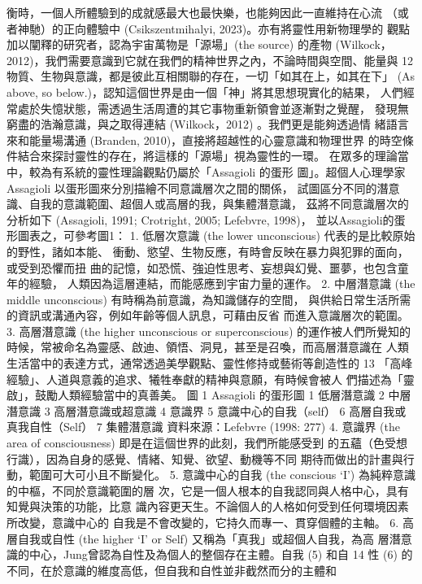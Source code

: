 衡時，一個人所體驗到的成就感最大也最快樂，也能夠因此一直維持在心流
（或者神馳）的正向體驗中 (Csikszentmihalyi, 2023)。亦有將靈性用新物理學的
觀點加以闡釋的研究者，認為宇宙萬物是「源場」(the source) 的產物 (Wilkock，
2012)，我們需要意識到它就在我們的精神世界之內，不論時間與空間、能量與
12 
物質、生物與意識，都是彼此互相關聯的存在，一切「如其在上，如其在下」
(As above, so below.)，認知這個世界是由一個「神」將其思想現實化的結果，
人們經常處於失憶狀態，需透過生活周遭的其它事物重新領會並逐漸對之覺醒，
發現無窮盡的浩瀚意識，與之取得連結 (Wilkock，2012) 。我們更是能夠透過情
緒語言來和能量場溝通 (Branden, 2010)，直接將超越性的心靈意識和物理世界
的時空條件結合來探討靈性的存在，將這樣的「源場」視為靈性的一環。 
在眾多的理論當中，較為有系統的靈性理論觀點仍屬於「Assagioli 的蛋形
圖」。超個人心理學家 Assagioli 以蛋形圖來分別描繪不同意識層次之間的關係，
試圖區分不同的潛意識、自我的意識範圍、超個人或高層的我，與集體潛意識，
茲將不同意識層次的分析如下 (Assagioli, 1991; Crotright, 2005; Lefebvre, 1998)，
並以Assagioli的蛋形圖表之，可參考圖1： 
1. 低層次意識 (the lower unconscious) 代表的是比較原始的野性，諸如本能、
衝動、慾望、生物反應，有時會反映在暴力與犯罪的面向，或受到恐懼而扭
曲的記憶，如恐慌、強迫性思考、妄想與幻覺、噩夢，也包含童年的經驗，
人類因為這層連結，而能感應到宇宙力量的運作。 
2. 中層潛意識 (the middle unconscious) 有時稱為前意識，為知識儲存的空間，
與供給日常生活所需的資訊或溝通內容，例如年齡等個人訊息，可藉由反省
而進入意識層次的範圍。 
3. 高層潛意識 (the higher unconscious or superconscious) 的運作被人們所覺知的
時候，常被命名為靈感、啟迪、領悟、洞見，甚至是召喚，而高層潛意識在
人類生活當中的表達方式，通常透過美學觀點、靈性修持或藝術等創造性的
13 
「高峰經驗」、人道與意義的追求、犧牲奉獻的精神與意願，有時候會被人
們描述為「靈啟」，鼓勵人類經驗當中的真善美。 
圖 1  
Assagioli 的蛋形圖 
1  低層潛意識 
2 中層潛意識 
3 高層潛意識或超意識 
4 意識界 
5 意識中心的自我（self） 
6 高層自我或真我自性（Self） 
7 集體潛意識 
資料來源：Lefebvre (1998: 277) 
4. 意識界 (the area of consciousness) 即是在這個世界的此刻，我們所能感受到
的五蘊（色受想行識），因為自身的感覺、情緒、知覺、欲望、動機等不同
期待而做出的計畫與行動，範圍可大可小且不斷變化。 
5. 意識中心的自我 (the conscious ‘I’) 為純粹意識的中樞，不同於意識範圍的層
次，它是一個人根本的自我認同與人格中心，具有知覺與決策的功能，比意
識內容更天生。不論個人的人格如何受到任何環境因素所改變，意識中心的
自我是不會改變的，它持久而專一、貫穿個體的主軸。 
6. 高層自我或自性 (the higher ‘I’ or Self) 又稱為「真我」或超個人自我，為高
層潛意識的中心，Jung曾認為自性及為個人的整個存在主體。自我 (5) 和自
14 
性 (6) 的不同，在於意識的維度高低，但自我和自性並非截然而分的主體和
